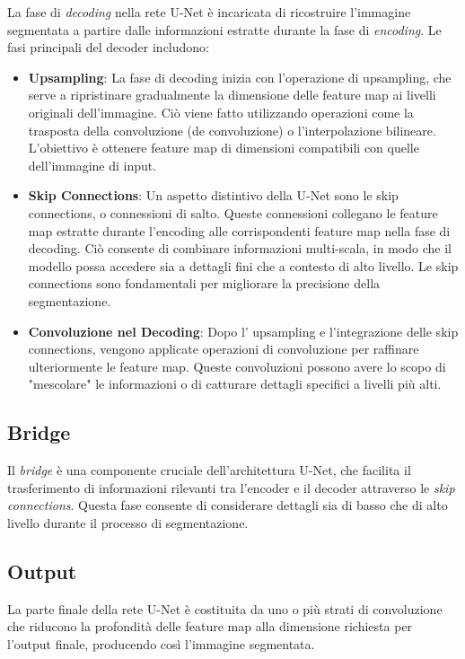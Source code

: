 La fase di \textit{decoding} nella rete U-Net è incaricata di ricostruire l'immagine segmentata a
partire dalle informazioni estratte durante la fase di \textit{encoding}. Le fasi principali del
decoder includono:
\begin{itemize}
	\item \textbf{Upsampling}: La fase di decoding inizia con l'operazione di upsampling, che serve a ripristinare gradualmente la dimensione delle feature map ai livelli originali dell'immagine. Ciò viene fatto utilizzando operazioni come la trasposta della convoluzione (de convoluzione) o l'interpolazione bilineare. L'obiettivo è ottenere feature map di dimensioni compatibili con quelle dell'immagine di input.
	\item \textbf{Skip Connections}: Un aspetto distintivo della U-Net sono le skip connections, o connessioni di salto. Queste connessioni collegano le feature map estratte durante l'encoding alle corrispondenti feature map nella fase di decoding. Ciò consente di combinare informazioni multi-scala, in modo che il modello possa accedere sia a dettagli fini che a contesto di alto livello. Le skip connections sono fondamentali per migliorare la precisione della segmentazione.
	\item \textbf{Convoluzione nel Decoding}: Dopo l' upsampling e l'integrazione delle skip connections, vengono applicate operazioni di convoluzione per raffinare ulteriormente le feature map. Queste convoluzioni possono avere lo scopo di "mescolare" le informazioni o di catturare dettagli specifici a livelli più alti.
\end{itemize}

\subsection{Bridge}
\label{sec:Bridge}

Il \textit{bridge} è una componente cruciale dell'architettura U-Net, che facilita il trasferimento
di informazioni rilevanti tra l'encoder e il decoder attraverso le \textit{skip connections}. Questa fase
consente di considerare dettagli sia di basso che di alto livello durante il processo di
segmentazione.

\subsection{Output}
\label{sec:Output}
La parte finale della rete U-Net è costituita da uno o più strati di convoluzione che riducono la
profondità delle feature map alla dimensione richiesta per l'output finale, producendo così
l'immagine segmentata.


